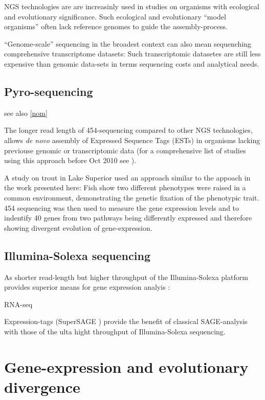 NGS technologies are are increasinly used in studies on organisms with
ecological and evolutionary significance. Such ecological and
evolutionary ``model organisms'' often lack reference genomes to guide
the assembly-process.

``Genome-scale'' sequencing in the broadest context can also mean
sequenching comprehensive transcriptome datasets: Such transcriptomic
datasetes are still less expensive than genomic data-sets in terms
sequencing costs and analytical needs.




\subsection{Pyro-sequencing}
\label{pyro-seq}

see also \ref{nom}

The longer read length of 454-sequencing \cite{pmid16056220} compared
to other NGS technologies, allows \textit{de novo} assembly of
Expressed Sequence Tags (ESTs) in organisms lacking previouse genomic
or transcriptomic data (for a comprehensive list of studies using this
approach before Oct 2010 see \cite{pmid20950480}).

A study on trout in Lake Superior \cite{pmid20331779} used an approach
similar to the appoach in the work presented here: Fish show two
different phenotypes were raised in a common environment,
demonstrating the genetic fixation of the phenotypic trait. 454
sequencing was then used to measure the gene expression levels and to
indentify 40 genes from two pathways being differently expressed and
therefore showing divergent evolution of gene-expression.


\subsection{Illumina-Solexa sequencing}
\label{ill-seq}




As shorter read-length but higher throughput of the Illumina-Solexa
platform provides superior means for gene expression analyis
\cite{pmid21627854}:

RNA-seq \cite{pmid19015660}

Expression-tags (SuperSAGE \cite{pmid20967605}) provide the benefit of
classical SAGE-analysis \cite{pmid7570003} with those of the ulta
hight throughput of Illumina-Solexa sequencing.


\section{Gene-expression and evolutionary divergence}

